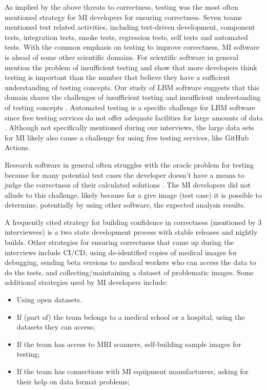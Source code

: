 \documentclass[final, 12pt, 3p, times]{elsarticle}
\begin{document}
\begin{enumerate}
As implied by the above threats to correctness, testing was the most often
mentioned strategy for MI developers for ensuring correctness.  Seven teams
mentioned test related activities, including test-driven development, component
tests, integration tests, smoke tests, regression tests, self tests and
automated tests.  With the common emphasis on testing to improve correctness, MI
software is ahead of some other scientific domains.  For scientific software in
general \cite{PintoEtAl2018} mention the problem of insufficient testing and
\cite{HannayEtAl2009} show that more developers think testing is important than
the number that believe they have a sufficient understanding of testing
concepts.  Our study of LBM software suggests that this domain shares the
challenges of insufficient testing and insufficient understanding of testing
concepts \cite{SmithEtAl2024}. Automated testing is a specific challenge for
LBM software since free testing services do not offer adequate facilities for
large amounts of data \cite{SmithEtAl2024}. Although not specifically mentioned
during our interviews, the large data sets for MI likely also cause a challenge
for using free testing services, like GitHub Actions.

Research software in general often struggles with the oracle problem for testing
because for many potential test cases the developer doesn't have a means to
judge the correctness of their calculated solutions \cite{HannayEtAl2009,
KanewalaAndBieman2013, KellyEtAl2011, WieseEtAl2019}.  The MI developers did not
allude to this challenge, likely because for a give image (test case) it is
possible to determine, potentially by using other software, the expected
analysis results.

A frequently cited strategy for building confidence in correctness (mentioned by
3 interviewees) is a two state development process with stable releases and
nightly builds.  Other strategies for ensuring correctness that came up during
the interviews include CI/CD, using de-identified copies of medical images for
debugging, sending beta versions to medical workers who can access the data to
do the tests, and collecting/maintaining a dataset of problematic images.  Some
additional strategies used by MI developers include:

\begin{itemize}
\item Using open datasets.
\item If (part of) the team belongs to a medical school or a hospital, using the
datasets they can access;
\item If the team has access to MRI scanners, self-building sample images for
testing;
\item If the team has connections with MI equipment manufacturers, asking for
their help on data format problems;
\end{itemize}


\end{enumerate}
\end{document}
